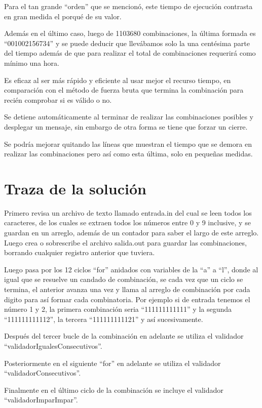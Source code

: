 \documentclass[9pt,twocolumn,twoside]{optica}
\begin{document}
Para el tan grande “orden” que se mencionó, este tiempo de ejecución contrasta en gran medida el porqué de su valor.

Además en el último caso, luego de 1103680 combinaciones, la última formada es “001002156734” y se puede deducir que llevábamos solo la una centésima parte del tiempo además de que para realizar el total de combinaciones requerirá como mínimo una hora.

Es eficaz al ser más rápido y eficiente al usar mejor el recurso tiempo, en comparación con el método de fuerza bruta que termina la combinación para recién comprobar si es válido o no. 

Se detiene automáticamente al terminar de realizar las combinaciones posibles y desplegar un mensaje, sin embargo de otra forma se tiene que forzar un cierre.

Se podría mejorar quitando las líneas que muestran el tiempo que se demora en realizar las combinaciones pero así como esta última, solo en pequeñas medidas.


\section{Traza de la solución}

Primero revisa un archivo de texto llamado entrada.in del cual se leen todos los caracteres, de los cuales se extraen todos los números entre 0 y 9 inclusive, y se guardan en un arreglo, además de un contador para saber el largo de este arreglo.
Luego crea o sobrescribe el archivo salida.out para guardar las combinaciones, borrando cualquier registro anterior que tuviera. 

Luego pasa por los 12 ciclos “for” anidados con variables de la “a” a “l”, donde al igual que se resuelve un candado de combinación, se cada vez que un ciclo se termina, el anterior avanza una vez y llama al arreglo de combinación por cada digito para así formar cada combinatoria. Por ejemplo si de entrada tenemos el número 1 y 2, la primera combinación seria “111111111111” y la segunda “111111111112”, la tercera “111111111121” y así sucesivamente.

Después del tercer bucle de la combinación en adelante se utiliza el validador “validadorIgualesConsecutivos”.

Posteriormente en el siguiente “for” en adelante se utiliza el validador “validadorConsecutivos”.

Finalmente en el último ciclo de la combinación se incluye el validador “validadorImparImpar”.
\end{document}
